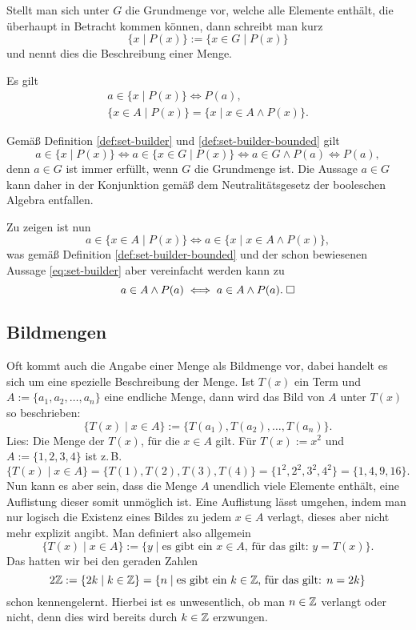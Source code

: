 \begin{Definition}%
\label{def:set-builder}
Stellt man sich unter $G$ die Grundmenge vor, welche
alle Elemente enthält, die überhaupt in Betracht kommen können,
dann schreibt man kurz
\[\{x\mid P(x)\} := \{x\in G\mid P(x)\}\]
und nennt dies die Beschreibung einer Menge.
\end{Definition}
\begin{Satz}
Es gilt
\begin{gather}
\label{eq:set-builder} a\in\{x\mid P(x)\}\iff P(a),\\
\{x\in A\mid P(x)\} = \{x\mid x\in A\land P(x)\}.
\end{gather}
\end{Satz}
 Gemäß Definition \ref{def:set-builder}
und \ref{def:set-builder-bounded} gilt
\[a\in\{x\mid P(x)\} \iff a\in\{x\in G\mid P(x)\}
\iff a\in G\land P(a)\iff P(a),\]
denn $a\in G$ ist immer erfüllt, wenn $G$ die Grundmenge ist.
Die Aussage $a\in G$ kann daher in der Konjunktion gemäß dem
Neutralitätsgesetz der booleschen Algebra entfallen.

Zu zeigen ist nun
\[a\in\{x\in A\mid P(x)\}\iff a\in\{x\mid x\in A\land P(x)\},\]
was gemäß Definition \ref{def:set-builder-bounded} und der schon
bewiesenen Aussage \eqref{eq:set-builder} aber vereinfacht
werden kann zu
\[a\in A\land P(a)\iff a\in A\land P(a).\;\Box\]


\subsection{Bildmengen}

Oft kommt auch die Angabe einer Menge als Bildmenge vor, dabei
handelt es sich um eine spezielle Beschreibung der Menge. Ist
$T(x)$ ein Term und $A:=\{a_1,a_2,\ldots,a_n\}$ eine endliche
Menge, dann wird das Bild von $A$ unter $T(x)$ so beschrieben:
\[\{T(x)\mid x\in A\} := \{T(a_1),T(a_2),\ldots, T(a_n)\}.\]
Lies: Die Menge der $T(x)$, für die $x\in A$ gilt.
Für $T(x):=x^2$ und $A:=\{1,2,3,4\}$ ist z.\,B.
\[\{T(x)\mid x\in A\} = \{T(1), T(2), T(3), T(4)\}
= \{1^2,2^2,3^2,4^2\} = \{1,4,9,16\}.\]
Nun kann es aber sein, dass die Menge $A$ unendlich viele Elemente
enthält, eine Auflistung dieser somit unmöglich ist. Eine Auflistung
lässt umgehen, indem man nur logisch die Existenz eines Bildes
zu jedem $x\in A$ verlagt, dieses aber nicht mehr explizit angibt.
Man definiert also allgemein
\[\{T(x)\mid x\in A\} := \{y\mid\text{es gibt ein $x\in A$, für das gilt: $y=T(x)$}\}.\]
Das hatten wir bei den geraden Zahlen
\[2\mathbb Z := \{2k\mid k\in\mathbb Z\} = \{n\mid\text{es gibt ein $k\in\mathbb Z$, für das gilt: $n=2k$}\}\]
schon kennengelernt. Hierbei ist es unwesentlich, ob man $n\in\mathbb Z$ verlangt
oder nicht, denn dies wird bereits durch $k\in\mathbb Z$ erzwungen.

